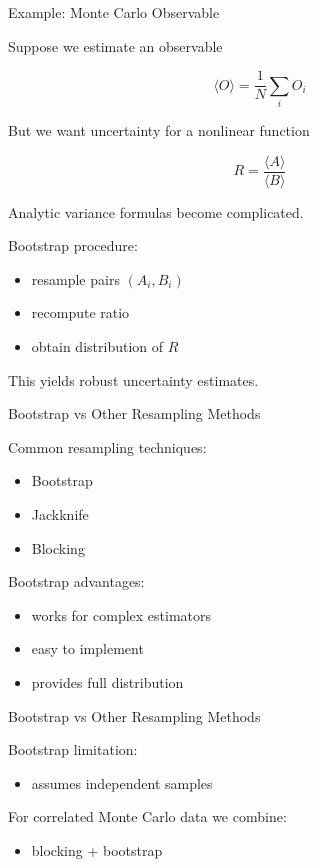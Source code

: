 \documentclass{beamer}
\begin{document}

\begin{frame}{Example: Monte Carlo Observable}

Suppose we estimate an observable

\[
\langle O \rangle
=
\frac{1}{N}\sum_i O_i
\]

But we want uncertainty for a nonlinear function

\[
R = \frac{\langle A \rangle}{\langle B \rangle}
\]

Analytic variance formulas become complicated.

Bootstrap procedure:

\begin{itemize}

\item resample pairs $(A_i,B_i)$
\item recompute ratio
\item obtain distribution of $R$

\end{itemize}

This yields robust uncertainty estimates.
\end{frame}


\begin{frame}{Bootstrap vs Other Resampling Methods}

Common resampling techniques:

\begin{itemize}

\item Bootstrap
\item Jackknife
\item Blocking
\end{itemize}

Bootstrap advantages:

\begin{itemize}

\item works for complex estimators
\item easy to implement
\item provides full distribution
\end{itemize}


\end{frame}


\begin{frame}{Bootstrap vs Other Resampling Methods}


Bootstrap limitation:

\begin{itemize}

\item assumes independent samples
\end{itemize}

For correlated Monte Carlo data we combine:

\begin{itemize}

\item blocking + bootstrap
\end{itemize}
\end{frame}
\end{document}
